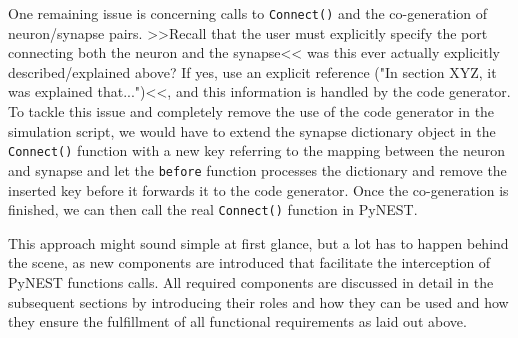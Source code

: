 One remaining issue is concerning calls to \texttt{Connect()} and the co-generation of neuron/synapse pairs. >>Recall that the user must explicitly specify the port connecting both the neuron and the synapse<< was this ever actually explicitly described/explained above? If yes, use an explicit reference ("In section XYZ, it was explained that...")<<, and this information is handled by the code generator. To tackle this issue and completely remove the use of the code generator in the simulation script, we would have to extend the synapse dictionary object in the \texttt{Connect()} function with a new key referring to the mapping between the neuron and synapse and let the \texttt{before} function processes the dictionary and remove the inserted key before it forwards it to the code generator. Once the co-generation is finished, we can then call the real \texttt{Connect()} function in PyNEST.

This approach might sound simple at first glance, but a lot has to happen behind the scene, as new components are introduced that facilitate the interception of PyNEST functions calls. All required components are discussed in detail in the subsequent sections by introducing their roles and how they can be used and how they ensure the fulfillment of all functional requirements as laid out above.


